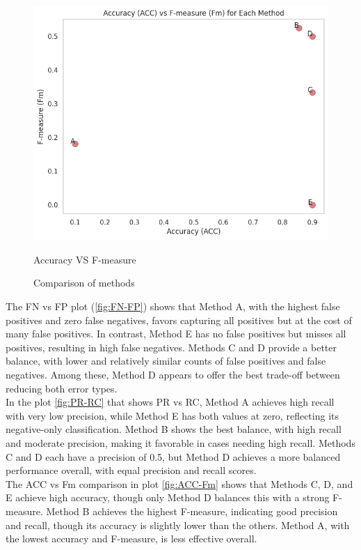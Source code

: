\documentclass{article}
\begin{document}
\begin{figure}[H]
\begin{minipage}{0.45\textwidth}
		\centering
		\includegraphics[width=\textwidth]{images/ACC-Fm.png}
		\caption{Accuracy VS F-measure}
		\label{fig:ACC-Fm}
	\end{minipage}\hfill

	\caption{Comparison of methods}
	\label{fig:comparison}
\end{figure}

The FN vs FP plot (\ref{fig:FN-FP}) shows that Method A, with the highest false positives and zero false negatives, favors capturing all positives but at the cost of many false positives. In contrast, Method E has no false positives but misses all positives, resulting in high false negatives. Methods C and D provide a better balance, with lower and relatively similar counts of false positives and false negatives. Among these, Method D appears to offer the best trade-off between reducing both error types.
\\

In the plot \ref{fig:PR-RC} that shows PR vs RC, Method A achieves high recall with very low precision, while Method E has both values at zero, reflecting its negative-only classification. Method B shows the best balance, with high recall and moderate precision, making it favorable in cases needing high recall. Methods C and D each have a precision of 0.5, but Method D achieves a more balanced performance overall, with equal precision and recall scores.
\\

The ACC vs Fm comparison in plot \ref{fig:ACC-Fm} shows that Methods C, D, and E achieve high accuracy, though only Method D balances this with a strong F-measure. Method B achieves the highest F-measure, indicating good precision and recall, though its accuracy is slightly lower than the others. Method A, with the lowest accuracy and F-measure, is less effective overall.
\\
\end{document}
